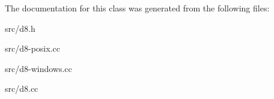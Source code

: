The documentation for this class was generated from the following files\+:\begin{DoxyCompactItemize}
\item 
src/d8.\+h\item 
src/d8-\/posix.\+cc\item 
src/d8-\/windows.\+cc\item 
src/d8.\+cc\end{DoxyCompactItemize}
